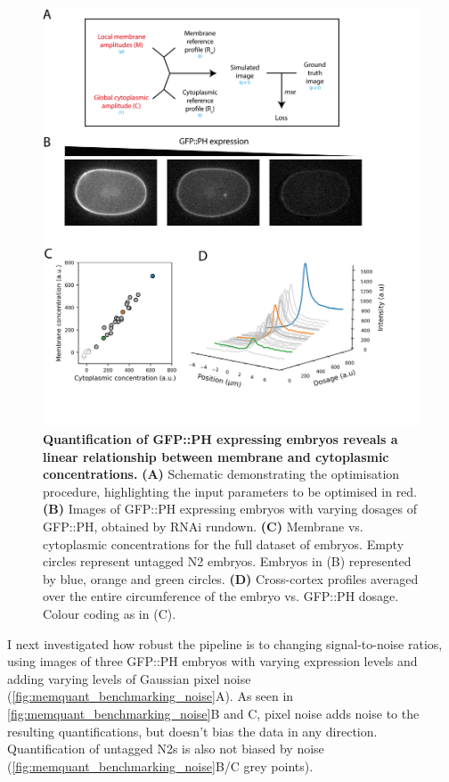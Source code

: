\documentclass[12pt]{"article"}
\newcommand{\mycaption}[2]{\caption[#1]{\textbf{#1.} #2}}
\begin{document}
\begin{figure}
\includegraphics[scale=1]{memquant_benchmarking_ph_rundown}
\centering
\mycaption{Quantification of GFP::PH expressing embryos reveals a linear relationship between membrane and cytoplasmic concentrations}{
\textbf{(A)} Schematic demonstrating the optimisation procedure, highlighting the input parameters to be optimised in red.
\textbf{(B)} Images of GFP::PH expressing embryos with varying dosages of GFP::PH, obtained by RNAi rundown.
\textbf{(C)} Membrane vs. cytoplasmic concentrations for the full dataset of embryos. Empty circles represent untagged N2 embryos. Embryos in (B) represented by blue, orange and green circles.
\textbf{(D)} Cross-cortex profiles averaged over the entire circumference of the embryo vs. GFP::PH dosage. Colour coding as in (C).
}
\label{fig:memquant_benchmarking_ph_rundown}
\end{figure}

I next investigated how robust the pipeline is to changing signal-to-noise ratios, using images of three GFP::PH embryos with varying expression levels and adding varying levels of Gaussian pixel noise (\cref{fig:memquant_benchmarking_noise}A). As seen in \cref{fig:memquant_benchmarking_noise}B and C, pixel noise adds noise to the resulting quantifications, but doesn't bias the data in any direction. Quantification of untagged N2s is also not biased by noise (\cref{fig:memquant_benchmarking_noise}B/C grey points).\\
\end{document}
